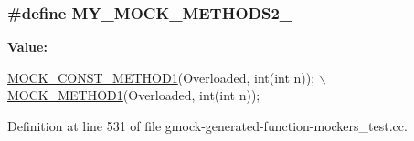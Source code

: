 \subsubsection[{\texorpdfstring{M\+Y\+\_\+\+M\+O\+C\+K\+\_\+\+M\+E\+T\+H\+O\+D\+S2\+\_\+}{MY_MOCK_METHODS2_}}]{\setlength{\rightskip}{0pt plus 5cm}\#define M\+Y\+\_\+\+M\+O\+C\+K\+\_\+\+M\+E\+T\+H\+O\+D\+S2\+\_\+}\hypertarget{gmock-generated-function-mockers__test_8cc_ac36252ad7584222cebc036d56465d652}{}\label{gmock-generated-function-mockers__test_8cc_ac36252ad7584222cebc036d56465d652}
{\bfseries Value\+:}
\begin{DoxyCode}
\hyperlink{gmock-generated-function-mockers_8h_a6f76aeb56f492cfe538e177b6aa77965}{MOCK\_CONST\_METHOD1}(Overloaded, \textcolor{keywordtype}{int}(\textcolor{keywordtype}{int} n)); \hyperlink{gmock-generated-function-mockers_8h_ac49d366be035ee87b73264a29059cdc7}{\(\backslash\)}
\hyperlink{gmock-generated-function-mockers_8h_ac49d366be035ee87b73264a29059cdc7}{    MOCK\_METHOD1}(Overloaded, \textcolor{keywordtype}{int}(\textcolor{keywordtype}{int} n));
\end{DoxyCode}


Definition at line 531 of file gmock-\/generated-\/function-\/mockers\+\_\+test.\+cc.

